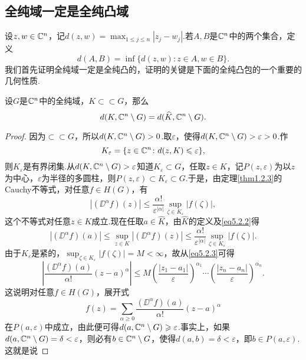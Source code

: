 \subsection{全纯域一定是全纯凸域}
设$z,w\in\mathbb C^n$，记$d(z,w)=\max_{1\le j\le n}|z_j-w_j|$.若$A,B$是$\mathbb C^n$中的两个集合，定义
\[d(A,B)=\inf\{d(z,w)\colon z\in A,w\in B\}.\]
我们首先证明全纯域一定是全纯凸的，证明的关键是下面的全纯凸包的一个重要的几何性质.
\begin{theorem}\label{thm5.2.1}
	设$G$是$\mathbb C^n$中的全纯域，$K\subset\subset G$，那么
	\begin{equation}\label{eq5.2.1}
		d(K,\mathbb C^n\setminus G)=d(\widehat{K},\mathbb C^n\setminus G).
	\end{equation}
\end{theorem}
\begin{proof}
	因为$\subset\subset G$，所以$d(K,\mathbb C^n\setminus G)>0$.取$\varepsilon$，使得$d(K,\mathbb C^n\setminus G)>\varepsilon>0$.作
	\[K_\varepsilon=\{z\in\mathbb C^n\colon d(z,K)\leqslant\varepsilon\},\]
	则$K_\varepsilon$是有界闭集.从$d(K,\mathbb C^n\setminus G)>\varepsilon$知道$K_\varepsilon\subset G$，任取$z\in K$，记$P(z,\varepsilon)$为以$z$为中心，$\varepsilon$为半径的多圆柱，则$P(z,\varepsilon)\subset K_\varepsilon\subset G$.于是，由定理\ref{thm1.2.3}的Cauchy不等式，对任意$f\in H(G)$，有
	\begin{equation}\label{eq5.2.2}
		\left|(\DD^\alpha f)(z)\right|\le\frac{\alpha!}{\varepsilon^{|\alpha|}}\sup_{\zeta\in K_\varepsilon}|f(\zeta)|,
	\end{equation}
这个不等式对任意$z\in K$成立.现在任取$a\in\widehat{K}$，由$\widehat{K}$的定义及\eqref{eq5.2.2}得
\begin{equation}\label{eq5.2.3}
	\left|(\DD^\alpha f)(a)\right|\le\sup_{z\in K}\left|(\DD^\alpha f)(z)\right|\le\frac{\alpha!}{\varepsilon^{|\alpha|}}\sup_{\zeta\in K_\varepsilon}|f(\zeta)|.
\end{equation}
由于$K_\varepsilon$是紧的，$\sup_{\zeta\in K_\varepsilon}|f(\zeta)|=M<\infty$，故从\eqref{eq5.2.3}可得
\[\left|\frac{(\DD^\alpha f)(a)}{\alpha!}(z-a)^\alpha\right|\le M\left(\frac{|z_1-a_1|}{\varepsilon}\right)^{\alpha_1}\cdots\left(\frac{|z_n-a_n|}{\varepsilon}\right)^{\alpha_n}.\]
这说明对任意$f\in H(G)$，展开式
\begin{equation}\label{eq5.2.4}
	f(z)=\sum_{\alpha\ge0}\frac{(\DD^\alpha f)(a)}{\alpha!}(z-a)^\alpha
\end{equation}
在$P(a,\varepsilon)$中成立，由此便可得$d(a,\mathbb C^n\setminus G)\geqslant\varepsilon$.事实上，如果$d(a,\mathbb C^n\setminus G)=\delta<\varepsilon$，则必有$b\in\mathbb C^n\setminus G$，使得$d(a,b)=\delta<\varepsilon$，即$b\in P(a,\varepsilon)$.这就是说

\end{proof}
